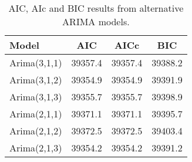 \begin{table}[ht]
\centering
\caption[alternative ARIMA models]{AIC, AIc and BIC results from alternative ARIMA models.} 
\label{tab:chp_ts:arima_res_r}
\begin{tabular}{lccc}
  \toprule Model & AIC & AICc & BIC \\ 
  \midrule Arima(3,1,1) & 39357.4 & 39357.4 & 39388.2 \\ 
  Arima(3,1,2) & 39354.9 & 39354.9 & 39391.9 \\ 
  Arima(3,1,3) & 39355.7 & 39355.7 & 39398.9 \\ 
  Arima(2,1,1) & 39371.1 & 39371.1 & 39395.7 \\ 
  Arima(2,1,2) & 39372.5 & 39372.5 & 39403.4 \\ 
  Arima(2,1,3) & 39354.2 & 39354.2 & 39391.2 \\ 
   \bottomrule \end{tabular}
\end{table}
